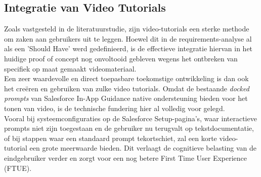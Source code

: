 \subsection{Integratie van Video Tutorials}
\label{subsec:video_tutorials}

Zoals vastgesteld in de literatuurstudie, zijn video-tutorials een sterke methode om zaken aan gebruikers uit te leggen. Hoewel dit in de requirements-analyse al als een 'Should Have' werd gedefinieerd, is de effectieve integratie hiervan in het huidige proof of concept nog onvoltooid gebleven wegens het ontbreken van specifiek op maat gemaakt videomateriaal.
\\

Een zeer waardevolle en direct toepasbare toekomstige ontwikkeling is dan ook het creëren en gebruiken van zulke video tutorials. Omdat de bestaande \textit{docked prompts} van Salesforce In-App Guidance native ondersteuning bieden voor het tonen van video, is de technische fundering hier al volledig voor gelegd. 
\\

Vooral bij systeemconfiguraties op de Salesforce Setup-pagina's, waar interactieve prompts niet zijn toegestaan en de gebruiker nu terugvalt op tekstdocumentatie, of bij stappen waar een standaard prompt tekortschiet, zal een korte video-tutorial een grote meerwaarde bieden. Dit verlaagt de cognitieve belasting van de eindgebruiker verder en zorgt voor een nog betere First Time User Experience (FTUE).